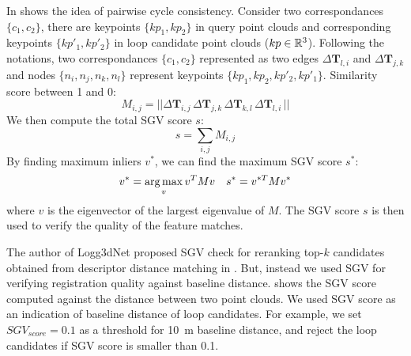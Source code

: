 In  shows the idea of pairwise cycle consistency. Consider two correspondances $\{c_1, c_2\}$, there are keypoints $\{kp_1, kp_2\}$ in query point clouds and corresponding keypoints $\{kp'_1, kp'_2\}$ in loop candidate point clouds ($kp \in \mathbb{R}^{3}$). Following the  notations, two correspondances $\{c_1, c_2\}$ represented as two edges $\Delta\mathbf{T}_{l,i}$ and $\Delta\mathbf{T}_{j,k}$ and nodes $\{n_i, n_j, n_k, n_l\}$ represent keypoints  $\{kp_1, kp_2, kp'_2, kp'_1\}$.
Similarity score between 1 and 0:
\begin{equation}
  M_{i,j} = ||\Delta\mathbf{T}_{i,j}\, \Delta\mathbf{T}_{j,k}\, \Delta\mathbf{T}_{k,l}\, \Delta\mathbf{T}_{l,i}\, ||
\end{equation}
We then compute the total SGV score $s$:
\begin{equation}
  s = \sum_{i,j} M_{i,j} 
\end{equation}
By finding maximum inliers $v^{*}$, we can find the maximum SGV score $s^{*}$: 
\begin{equation}
  v^{*} = \operatorname*{arg\,max}_{v} v^T M v \quad
  s^{*} = v^{*T} M v^{*}
\end{equation}
where $v$ is the eigenvector of the largest eigenvalue of $M$. The SGV score $s$ is then used to verify the quality of the feature matches.

The author of Logg3dNet proposed SGV check for reranking top-$k$ candidates obtained from descriptor distance matching in . But, instead we used SGV for verifying registration quality against baseline distance.  shows the SGV score computed against the distance between two point clouds. We used SGV score as an indication of baseline distance of loop candidates. For example, we set $SGV_{score}=0.1$ as a threshold for \SI{10}{\meter} baseline distance, and reject the loop candidates if SGV score is smaller than 0.1.



